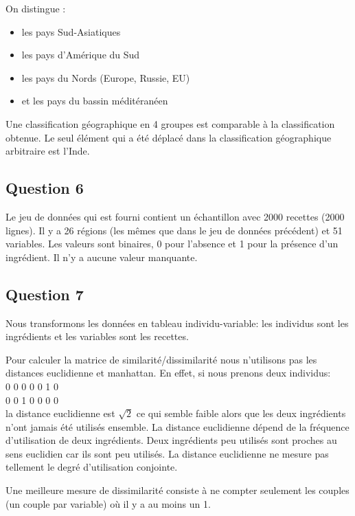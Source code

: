 \documentclass[a4paper,11pt,oneside,roman]{article}
\begin{document}
    On distingue :
    \begin{itemize}
        \item les pays Sud-Asiatiques
        \item les pays d'Amérique du Sud
        \item les pays du Nords (Europe, Russie, EU)
        \item et les pays du bassin méditéranéen
    \end{itemize}
    Une classification géographique en 4 groupes est comparable à la classification obtenue. Le seul élément qui a été déplacé dans la classification géographique arbitraire est l'Inde.


    \subsection*{Question 6}
    Le jeu de données qui est fourni contient un échantillon avec 2000 recettes (2000 lignes).
    Il y a 26 régions (les mêmes que dans le jeu de données précédent) et 51 variables.
    Les valeurs sont binaires, 0 pour l'absence et 1 pour la présence d'un ingrédient.
    Il n'y a aucune valeur manquante.
    
    \subsection*{Question 7}

    Nous transformons les données en tableau individu-variable: les individus sont les ingrédients et les variables sont les recettes.
   
    Pour calculer la matrice de similarité/dissimilarité nous n'utilisons pas les distances euclidienne et manhattan.
    En effet, si nous prenons deux individus:\\
    0 0 0 0 0 1 0\\
    0 0 1 0 0 0 0\\
    la distance euclidienne est $\sqrt{2}$ ce qui semble faible alors que les deux ingrédients n'ont jamais été utilisés ensemble. 
    La distance euclidienne dépend de la fréquence d'utilisation de deux ingrédients. 
    Deux ingrédients peu utilisés sont proches au sens euclidien car ils sont peu utilisés.
    La distance euclidienne ne mesure pas tellement le degré d'utilisation conjointe.

    Une meilleure mesure de dissimilarité consiste à ne compter seulement les couples (un couple par variable) où il y a au moins un 1.
    
\end{document}
